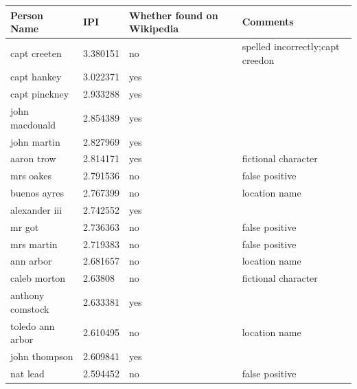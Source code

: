\documentclass[letterpaper,11pt]{report}
\begin{document}
\begin{table}[!h]
\centering
\begin{tabular}{|l|l|p{3cm}|p{3cm}|}
\hline
\textbf{Person Name}      & \textbf{IPI}      & \textbf{Whether found on Wikipedia} & \textbf{Comments}                                     \\ \hline
capt creeten     & 3.380151 & no                 & spelled incorrectly;capt creedon \\ \hline
capt hankey      & 3.022371 & yes                &                                      \\ \hline
capt pinckney    & 2.933288 & yes                &                                      \\ \hline
john macdonald   & 2.854389 & yes                &                                      \\ \hline
john martin      & 2.827969 & yes                &                                      \\ \hline
aaron trow       & 2.814171 & yes                & fictional character                  \\ \hline
mrs oakes        & 2.791536 & no                 & false positive                       \\ \hline
buenos ayres     & 2.767399 & no                 & location name                            \\ \hline
alexander iii    & 2.742552 & yes                &                                      \\ \hline
mr got           & 2.736363 & no                 & false positive                       \\ \hline
mrs martin       & 2.719383 & no                 & false positive                       \\ \hline
ann arbor        & 2.681657 & no                 & location name                            \\ \hline
caleb morton     & 2.63808  & no                 & fictional character                  \\ \hline
anthony comstock & 2.633381 & yes                &                                      \\ \hline
toledo ann arbor & 2.610495 & no                 & location name                            \\ \hline
john thompson    & 2.609841 & yes                &                                      \\ \hline
nat lead         & 2.594452 & no                 & false positive                       \\ \hline

\end{tabular}
\end{table}
\end{document}
